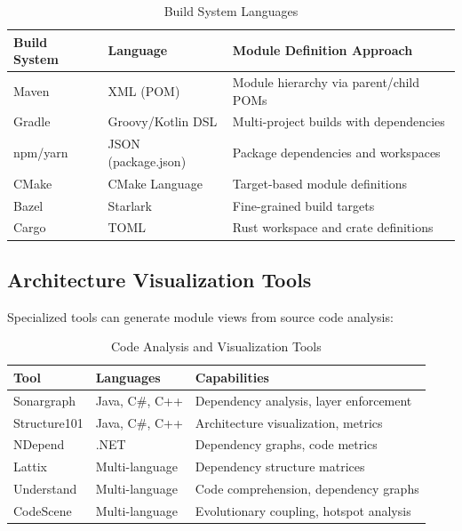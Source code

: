 \documentclass[11pt,letterpaper]{article}
\begin{document}
\begin{table}[H]
\centering
\caption{Build System Languages}
\small
\begin{tabular}{@{}L{3cm}L{3cm}L{7.5cm}@{}}
\toprule
\textbf{Build System} & \textbf{Language} & \textbf{Module Definition Approach} \\
\midrule
Maven & XML (POM) & Module hierarchy via parent/child POMs \\
Gradle & Groovy/Kotlin DSL & Multi-project builds with dependencies \\
npm/yarn & JSON (package.json) & Package dependencies and workspaces \\
CMake & CMake Language & Target-based module definitions \\
Bazel & Starlark & Fine-grained build targets \\
Cargo & TOML & Rust workspace and crate definitions \\
\bottomrule
\end{tabular}
\end{table}

\subsection{Architecture Visualization Tools}

Specialized tools can generate module views from source code analysis:

\begin{table}[H]
\centering
\caption{Code Analysis and Visualization Tools}
\small
\begin{tabular}{@{}L{3cm}L{4cm}L{6.5cm}@{}}
\toprule
\textbf{Tool} & \textbf{Languages} & \textbf{Capabilities} \\
\midrule
Sonargraph & Java, C\#, C++ & Dependency analysis, layer enforcement \\
Structure101 & Java, C\#, C++ & Architecture visualization, metrics \\
NDepend & .NET & Dependency graphs, code metrics \\
Lattix & Multi-language & Dependency structure matrices \\
Understand & Multi-language & Code comprehension, dependency graphs \\
CodeScene & Multi-language & Evolutionary coupling, hotspot analysis \\
\bottomrule
\end{tabular}
\end{table}
\end{document}

